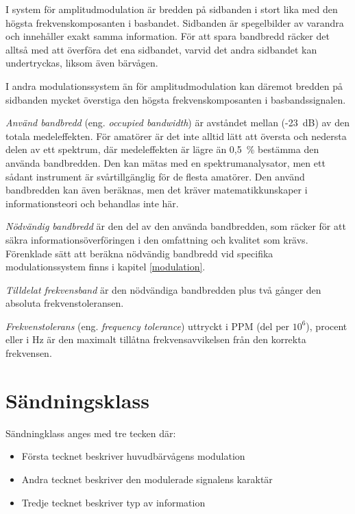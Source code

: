 I system för amplitudmodulation är bredden på sidbanden i stort lika med den
högsta frekvenskomposanten i basbandet.
Sidbanden är spegelbilder av varandra och innehåller exakt samma information.
För att spara bandbredd räcker det alltså med att överföra det ena sidbandet,
varvid det andra sidbandet kan undertryckas, liksom även bärvågen.

I andra modulationssystem än för amplitudmodulation kan däremot bredden på
sidbanden mycket överstiga den högsta frekvenskomposanten i basbandssignalen.

\emph{Använd bandbredd} (eng. \emph{occupied bandwidth}) är avståndet mellan
(-23~dB) av den totala medeleffekten.
För amatörer är det inte alltid lätt att översta och nedersta delen av ett
spektrum, där medeleffekten är lägre än 0,5~\% bestämma den använda bandbredden.
Den kan mätas med en spektrumanalysator, men ett sådant instrument är
svårtillgänglig för de flesta amatörer.
Den använd bandbredden kan även beräknas, men det kräver matematikkunskaper i
informationsteori och behandlas inte här.

\emph{Nödvändig bandbredd} är den del av den använda bandbredden, som räcker
för att säkra informationsöverföringen i den omfattning och kvalitet som krävs.
Förenklade sätt att beräkna nödvändig bandbredd vid specifika modulationssystem
finns i kapitel \ref{modulation}.

\emph{Tilldelat frekvensband} är den nödvändiga bandbredden plus två gånger den
absoluta frekvenstoleransen.

\emph{Frekvenstolerans} (eng. \emph{frequency tolerance}) uttryckt i PPM (del per
\(10^6\)), procent eller i Hz är den maximalt tillåtna frekvensavvikelsen från
den korrekta frekvensen.

\section{Sändningsklass}

Sändningklass anges med tre tecken där:

\begin{itemize}
\item 
	Första tecknet beskriver huvudbärvågens modulation 
\item 
	Andra tecknet beskriver den modulerade signalens karaktär 
\item 
	Tredje tecknet beskriver typ av information 
\end{itemize}


